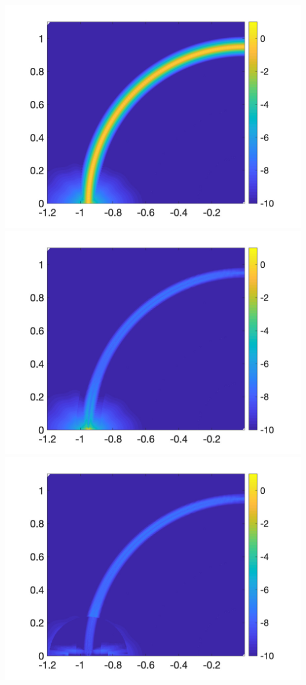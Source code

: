 \includegraphics[trim=40 20 40 10, clip, width=2.5truein]{figs/fig200a3} 
\includegraphics[trim=40 20 40 10, clip, width=2.5truein]{figs/fig200b3} 
\includegraphics[trim=40 20 40 10, clip, width=2.5truein]{figs/fig200c3}\\ 
